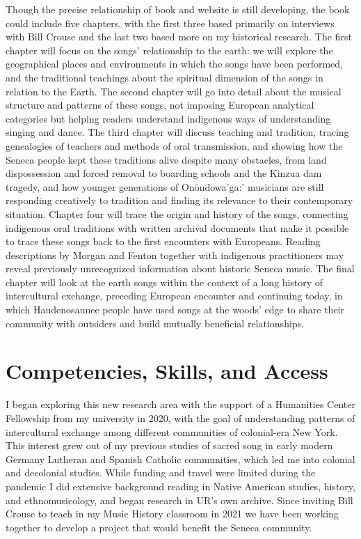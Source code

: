 \documentclass{neh}
\begin{document}
Though the precise relationship of book and website is still developing, the
book could include five chapters, with the first three based primarily on
interviews with Bill Crouse and the last two based more on my historical
research.
The first chapter will focus on the songs' relationship to the earth:
we will explore the geographical places and environments in which the songs
have been performed, and the traditional teachings about the spiritual
dimension of the songs in relation to the Earth.
The second chapter will go into detail about the musical structure and
patterns of these songs, not imposing European analytical categories but
helping readers understand indigenous ways of understanding singing and dance.
The third chapter will discuss teaching and tradition, tracing genealogies of
teachers and methods of oral transmission, and showing how the Seneca people
kept these traditions alive despite many obstacles, from land dispossession
and forced removal to boarding schools and the Kinzua dam tragedy, and how
younger generations of Onöndowa’ga:’ musicians are still responding creatively
to tradition and finding its relevance to their contemporary situation.
Chapter four will trace the origin and history of the songs, connecting
indigenous oral traditions with written archival documents that make it
possible to trace these songs back to the first encounters with Europeans.
Reading descriptions by Morgan and Fenton together with indigenous
practitioners may reveal previously unrecognized information about historic
Seneca music.
The final chapter will look at the earth songs within the context of a long
history of intercultural exchange, preceding European encounter and continuing
today, in which Haudenosaunee people have used songs at the woods' edge to
share their community with outsiders and build mutually beneficial
relationships.
\section{Competencies, Skills, and Access}

I began exploring this new research area with the support of a Humanities
Center Fellowship from my university in 2020, with the goal of understanding
patterns of intercultural exchange among different communities of colonial-era
New York.
This interest grew out of my previous studies of sacred song in early modern
Germany Lutheran and Spanish Catholic communities, which led me into colonial
and decolonial studies.
While funding and travel were limited during the pandemic I did extensive
background reading in Native American studies, history, and ethnomusicology,
and began research in UR's own archive.
Since inviting Bill Crouse to teach in my Music History classroom in 2021 we
have been working together to develop a project that would benefit the Seneca
community.
\end{document}
